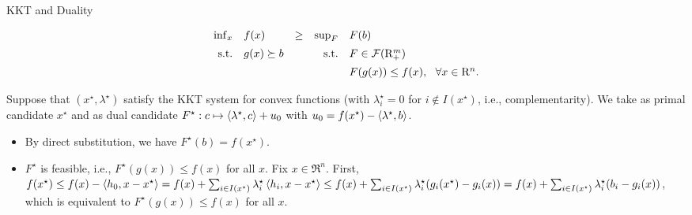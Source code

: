 \documentclass[9pt]{beamer}
\begin{document}
\begin{frame}{KKT and Duality}


  \[
    \begin{array}{rlcrl}
      \inf_x & f(x)  & \geq & \sup_F & F(b) \\[0.5em]
      \mathrm{s.t.} & g(x) \succeq b   & &                       \mathrm{s.t.} & F \in \mathcal F(\mathrm{R}^m_+) \\[0.5em]
             & &&    & F(g(x)) \leq f(x), ~~\forall x \in \mathrm{R}^n.
    \end{array}
  \]

  \vfill

  
  Suppose that $(x^\star, \lambda^\star)$ satisfy the KKT system for convex functions (with $\lambda_i^\star=0$ for $i\notin I(x^\star)$, i.e., complementarity).
  We take as primal candidate $x^\star$ and as dual candidate $F^\star: c \mapsto \left<\lambda^\star, c\right> + u_0$ with $u_0 = f(x^\star) - \left<\lambda^\star, b\right>$.

  \vfill

  \begin{itemize}
  \item<2-> By direct substitution, we have $F^\star(b) = f(x^\star)$.
  \item<3-> $F^\star$ is feasible, i.e., $F^\star(g(x)) \leq f(x)$ for all $x$. Fix $x\in \Re^n$. First, $f(x^\star) \leq f(x) - \left<h_0, x-x^\star\right> = f(x) + \sum_{i\in I(x^\star)} \lambda_i^\star \left<h_i, x-x^\star\right> \leq f(x) + \sum_{i\in I(x^\star)} \lambda_i^\star (g_i(x^\star)-g_i(x)) = f(x) + \sum_{i\in I(x^\star)} \lambda_i^\star (b_i - g_i(x))$, which is equivalent to $F^\star(g(x))\leq f(x)$ for all $x$.
  \end{itemize}

  \vfill

\end{frame}


\end{document}
